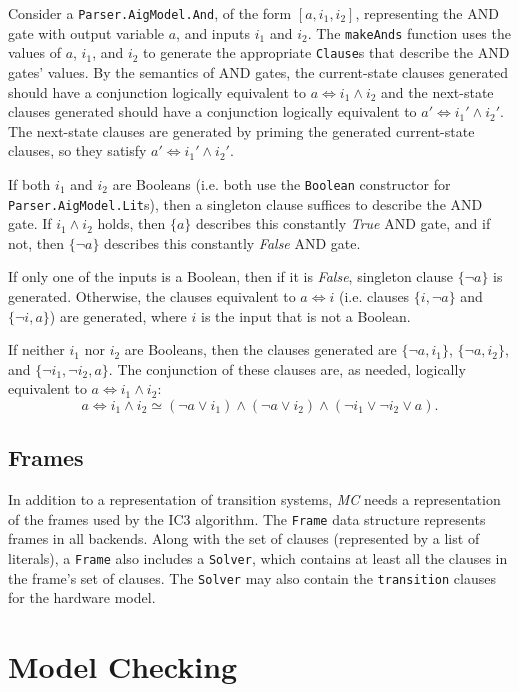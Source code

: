\documentclass[12pt,a4paper,twoside,openright]{report}
\begin{document}
{{Consider a \verb,Parser.AigModel.And,, of the form $[a, i_1, i_2]$, representing the AND gate
with output variable $a$, and inputs $i_1$ and $i_2$.
The \verb,makeAnds, function uses the values of $a$, $i_1$, and $i_2$ to generate the appropriate
\verb,Clause,s that describe the AND gates' values.
By the semantics of AND gates, the current-state clauses generated should have a conjunction
logically equivalent to $a \Leftrightarrow i_1 \wedge i_2$ and the next-state
clauses generated should have a conjunction logically equivalent to
$a' \Leftrightarrow i_1' \wedge i_2'$. The next-state clauses are generated
by priming the generated current-state clauses, so they satisfy
$a' \Leftrightarrow i_1' \wedge i_2'$.

If both $i_1$ and $i_2$ are Booleans (i.e. both use the \verb,Boolean,
constructor for \verb,Parser.AigModel.Lit,s), then a singleton clause suffices to describe the AND gate.
If $i_1 \wedge i_2$ holds, then $\{a\}$ describes this constantly {\it True} AND gate,
and if not, then $\{\neg a\}$ describes this constantly {\it False} AND gate.

If only one of the inputs is a Boolean, then if it is {\it False},
singleton clause $\{\neg a\}$ is generated. Otherwise,
the clauses equivalent to $a \Leftrightarrow i$ (i.e. clauses
$\{i, \neg a\}$ and $\{\neg i, a\}$)
are generated, where $i$ is the input that is not a Boolean.

If neither $i_1$ nor $i_2$ are Booleans, then the clauses generated are
$\{\neg a, i_1\}$, $\{\neg a, i_2\}$, and
$\{\neg i_1,\neg i_2, a\}$. The conjunction of these clauses are, as needed,
logically equivalent to $a \Leftrightarrow i_1 \wedge i_2$:
$$a \Leftrightarrow i_1 \wedge i_2 \simeq
(\neg a \vee i_1) \wedge (\neg a \vee i_2) \wedge (\neg i_1 \vee \neg i_2 \vee a).$$

\subsection{Frames}
In addition to a representation of transition systems, \emph{MC} needs a representation
of the frames used by the IC3 algorithm.
The \verb,Frame, data structure represents frames in all backends.
Along with the set of clauses (represented by a list of literals), a \verb,Frame, also
includes a \verb,Solver,, which contains at least all the clauses in the frame's set
of clauses.
The \verb,Solver, may also contain the \verb,transition, clauses for the hardware model.

\section{Model Checking}
\label{impl:modelchecker}

}}
\end{document}
